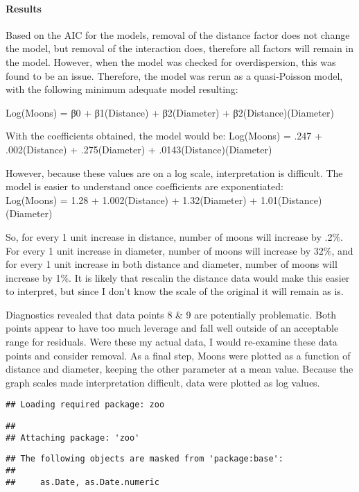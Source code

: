 \documentclass[]{article}
\let\oldparagraph\paragraph
\renewcommand{\paragraph}[1]{\oldparagraph{#1}\mbox{}}
\begin{document}
\paragraph{Results}\label{results-1}

Based on the AIC for the models, removal of the distance factor does not
change the model, but removal of the interaction does, therefore all
factors will remain in the model. However, when the model was checked
for overdispersion, this was found to be an issue. Therefore, the model
was rerun as a quasi-Poisson model, with the following minimum adequate
model resulting:

Log(Moons) = β0 + β1(Distance) + β2(Diameter) + β2(Distance)(Diameter)

With the coefficients obtained, the model would be: Log(Moons) = .247 +
.002(Distance) + .275(Diameter) + .0143(Distance)(Diameter)

However, because these values are on a log scale, interpretation is
difficult. The model is easier to understand once coefficients are
exponentiated:\\
Log(Moons) = 1.28 + 1.002(Distance) + 1.32(Diameter) +
1.01(Distance)(Diameter)

So, for every 1 unit increase in distance, number of moons will increase
by .2\%. For every 1 unit increase in diameter, number of moons will
increase by 32\%, and for every 1 unit increase in both distance and
diameter, number of moons will increase by 1\%. It is likely that
rescalin the distance data would make this easier to interpret, but
since I don't know the scale of the original it will remain as is.

Diagnostics revealed that data points 8 \& 9 are potentially
problematic. Both points appear to have too much leverage and fall well
outside of an acceptable range for residuals. Were these my actual data,
I would re-examine these data points and consider removal. As a final
step, Moons were plotted as a function of distance and diameter, keeping
the other parameter at a mean value. Because the graph scales made
interpretation difficult, data were plotted as log values.

\begin{verbatim}
## Loading required package: zoo
\end{verbatim}

\begin{verbatim}
## 
## Attaching package: 'zoo'
\end{verbatim}

\begin{verbatim}
## The following objects are masked from 'package:base':
## 
##     as.Date, as.Date.numeric
\end{verbatim}
\end{document}
